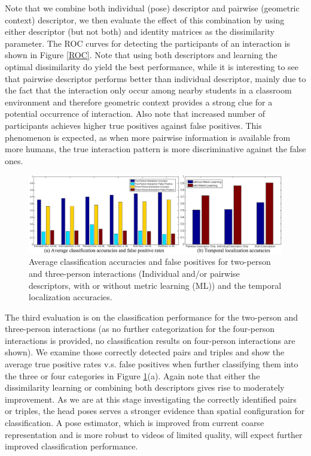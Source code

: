 Note that we combine both individual (pose) descriptor and pairwise (geometric context) descriptor, we then evaluate the effect of this combination by using either descriptor (but not both) and identity matrices as the dissimilarity parameter. The ROC curves for detecting the participants of an interaction is shown in Figure \ref{ROC}. Note that using both descriptors and learning the optimal dissimilarity do yield the best performance, while it is interesting to see that pairwise descriptor performs better than individual descriptor, mainly due to the fact that the interaction only occur among nearby students in a classroom environment and therefore geometric context provides a strong clue for a potential occurrence of interaction. Also note that increased number of participants achieves higher true positives against false positives. This phenomenon is expected, as when more pairwise information is available from more humans, the true interaction pattern is more discriminative against the false ones.

\begin{figure}[t]
\begin{center}
\includegraphics[scale=2.5]{classtemporal.png}
\end{center}
\caption{ Average classification accuracies and false positives for two-person and three-person interactions (Individual and/or pairwise descriptors, with or without metric learning (ML)) and the temporal localization accuracies.}
\label{classtemporal}
\end{figure}

The third evaluation is on the classification performance for the two-person and three-person interactions (as no further categorization for the four-person interactions is provided, no classification results on four-person interactions are shown). We examine those correctly detected pairs and triples and show the average true positive rates v.s. false positives when further classifying them into the three or four categories in Figure \ref{classtemporal}(a). Again note that either the dissimilarity learning or combining both descriptors gives rise to moderately improvement. As we are at this stage investigating the correctly identified pairs or triples, the head poses serves a stronger evidence than spatial configuration for classification. A pose estimator, which is improved from current coarse representation and is more robust to videos of limited quality, will expect further improved classification performance.

